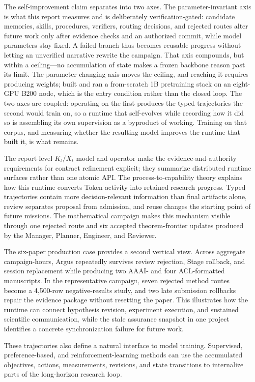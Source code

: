 The self-improvement claim separates into two axes. The parameter-invariant axis is
what this report measures and is deliberately verification-gated: candidate memories,
skills, procedures, verifiers, routing decisions, and rejected routes alter future
work only after evidence checks and an authorized commit, while model parameters stay
fixed. A failed branch thus becomes reusable progress without letting an unverified
narrative rewrite the campaign. That axis compounds, but within a ceiling---no
accumulation of state makes a frozen backbone reason past its limit. The
parameter-changing axis moves the ceiling, and reaching it requires producing
weights; \systemname{} built and ran a from-scratch 1B pretraining stack on an
eight-GPU B200 node, which is the entry condition rather than the closed loop. The
two axes are coupled: operating on the first produces the typed trajectories the
second would train on, so a runtime that self-evolves while recording how it did so
is assembling its own supervision as a byproduct of working. Training on that corpus,
and measuring whether the resulting model improves the runtime that built it, is what
remains.

The report-level $K_t/X_t$ model and  operator make the
evidence-and-authority requirements for contract refinement explicit; they summarize
distributed runtime surfaces rather than one atomic API. The process-to-capability
theory explains how this runtime converts Token activity
into retained research progress. Typed trajectories contain more decision-relevant
information than final artifacts alone, review separates proposal from admission,
and reuse changes the starting point of future missions. The mathematical
campaign makes this mechanism visible through one rejected route and six accepted
theorem-frontier updates produced by the Manager, Planner, Engineer, and Reviewer.

The six-paper production case provides a second vertical view. Across
\PaperCaseCampaignHours{} aggregate campaign-hours, Argus repeatedly survives
review rejection, Stage rollback, and session replacement while producing two
AAAI- and four ACL-formatted manuscripts. In the representative campaign, seven
rejected method routes become a 4,500-row negative-results study, and two late
submission rollbacks repair the evidence package without resetting the paper. This
illustrates how the runtime can connect hypothesis revision, experiment
execution, and sustained scientific communication, while the stale assurance
snapshot in one project identifies a concrete synchronization failure for future
work.

These trajectories also define a natural interface to model training. Supervised,
preference-based, and reinforcement-learning methods can use the accumulated
objectives, actions, measurements, revisions, and state transitions to internalize
parts of the long-horizon research loop.
